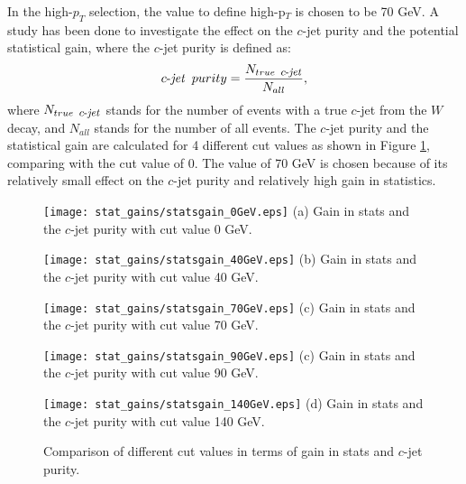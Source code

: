 \documentclass[letterpaper,12pt]{article}
\newcommand\cjetineq{\mathop{\mbox{$c$-$\mathit{jet}$}}}
\newcommand\cjetunder{\mathop{\footnotesize{\mbox{$c$-$\mathit{jet}$}}}\normalsize}
\begin{document}
In the high-$p_{T}$ selection, the value to define high-p$_{T}$ is 
chosen to be 70 GeV. A study has been done to investigate the effect 
on the $c$-jet purity and the potential statistical gain, where the $c$-jet purity is defined as:
\begin{equation}
\cjetineq\ purity = \frac{N_{true\ \cjetunder}}{N_{all}},
\end{equation}
where $N_{true\ \cjetunder}$ stands for the number of events with a 
true $c$-jet from the $W$ decay, and $N_{all}$ stands for the number of all events. 
The $c$-jet purity and the statistical gain are calculated for 4 different cut 
values as shown in Figure \ref{fig:cutvalue}, comparing with the cut value of 0. 
The value of 70 GeV is chosen because of its relatively small effect on the $c$-jet 
purity and relatively high gain in statistics. 


\begin{figure}
\begin{minipage}[b]{.45\textwidth}
\centering
\texttt{[image: stat\_gains/statsgain\_0GeV.eps]}
\footnotesize (a) Gain in stats and the $c$-jet purity with cut value 0 GeV.
\end{minipage}\hfill
\begin{minipage}[b]{.45\textwidth}
\centering
\texttt{[image: stat\_gains/statsgain\_40GeV.eps]}
\footnotesize (b) Gain in stats and the $c$-jet purity with cut value 40 GeV.
\end{minipage}\hfill
\begin{minipage}[b]{.45\textwidth}
\centering
\texttt{[image: stat\_gains/statsgain\_70GeV.eps]}
\footnotesize (c) Gain in stats and the $c$-jet purity with cut value 70 GeV.
\end{minipage}\hfill
\begin{minipage}[b]{.45\textwidth}
\centering
\texttt{[image: stat\_gains/statsgain\_90GeV.eps]}
\footnotesize (c) Gain in stats and the $c$-jet purity with cut value 90 GeV.
\end{minipage}\hfill
\begin{minipage}[b]{.45\textwidth}
\centering
\texttt{[image: stat\_gains/statsgain\_140GeV.eps]}
\footnotesize (d) Gain in stats and the $c$-jet purity with cut value 140 GeV.
\end{minipage}\hfill

\caption{Comparison of different cut values in terms of gain in stats and $c$-jet purity.}
\label{fig:cutvalue}
\end{figure}
\end{document}
